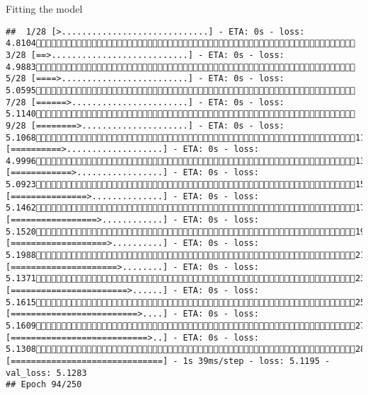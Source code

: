 \documentclass[
  ignorenonframetext,
]{beamer}
\begin{document}
\begin{frame}[fragile]{Fitting the model}
\begin{verbatim}
##  1/28 [>.............................] - ETA: 0s - loss: 4.8104 3/28 [==>...........................] - ETA: 0s - loss: 4.9883 5/28 [====>.........................] - ETA: 0s - loss: 5.0595 7/28 [======>.......................] - ETA: 0s - loss: 5.1140 9/28 [========>.....................] - ETA: 0s - loss: 5.106811/28 [==========>...................] - ETA: 0s - loss: 4.999613/28 [============>.................] - ETA: 0s - loss: 5.092315/28 [===============>..............] - ETA: 0s - loss: 5.146217/28 [=================>............] - ETA: 0s - loss: 5.152019/28 [===================>..........] - ETA: 0s - loss: 5.198821/28 [=====================>........] - ETA: 0s - loss: 5.137123/28 [=======================>......] - ETA: 0s - loss: 5.161525/28 [=========================>....] - ETA: 0s - loss: 5.160927/28 [===========================>..] - ETA: 0s - loss: 5.130828/28 [==============================] - 1s 39ms/step - loss: 5.1195 - val_loss: 5.1283
## Epoch 94/250

\end{verbatim}
\end{frame}
\end{document}
